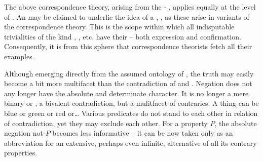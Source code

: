   
\label{pa:truthB}
The above correspondence theory, arising from the -
, applies equally at the level of . An
 may be claimed to underlie the idea of a , , as these arise in variants of the correspondence theory. This is the
scope within which all indisputable trivialities of the kind
, , etc. have their  -- both
expression and confirmation. Consequently, it is from this sphere that
correspondence theorists fetch all their  examples. 

Although emerging directly from the assumed ontology of , the truth
may easily become a bit more multifacet than the contradiction of 
 and . 
Negation does not any longer have the absolute and determinate character.  It is
no longer a mere binary  or , a bivalent contradiction, but a
mulitfacet  of contraries.  A thing can be blue or green or red or\ldots
  Various predicates do not stand to each other in relation of contradiction,
yet they may exclude each other.  For a property $P$, the absolute negation
not-$P$ becomes less informative -- it can be now taken only as an abbreviation
for an extensive, perhaps even infinite, alternative of all its contrary
properties.

